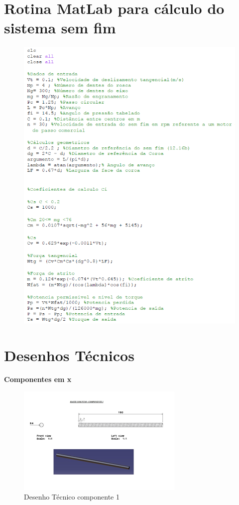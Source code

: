 \begin{apendicesenv}

\chapter{Rotina MatLab para cálculo do sistema sem fim}

\begin{figure}[H]
    \centering
      \includegraphics[scale=1.0]{figuras/matlabsemfim.png}
    \label{matlabsemfim}
\end{figure}

\chapter{Desenhos Técnicos}

\textbf{Componentes em x}

\begin{figure}[H]
    \centering
      \includegraphics[scale=1.0]{figuras/tec1.png}
    \caption{Desenho Técnico componente 1}
    \label{tec1}
\end{figure}


\end{apendicesenv}
